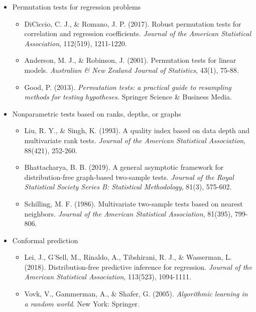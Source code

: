 \documentclass[11pt]{article}
\begin{document}
\begin{itemize}
\item Permutation tests for regression problems
\begin{itemize}
\item DiCiccio, C. J., \& Romano, J. P. (2017). Robust permutation tests for correlation and regression coefficients. \textit{Journal of the American Statistical Association}, 112(519), 1211-1220.

\item Anderson, M. J., \& Robinson, J. (2001). Permutation tests for linear models. \textit{Australian \& New Zealand Journal of Statistics}, 43(1), 75-88.

\item Good, P. (2013). \textit{Permutation tests: a practical guide to resampling methods for testing hypotheses.} Springer Science \& Business Media.
\end{itemize}

\item Nonparametric tests based on ranks, depths, or graphs
\begin{itemize}
\item Liu, R. Y., \& Singh, K. (1993). A quality index based on data depth and multivariate rank tests. \textit{Journal of the American Statistical Association}, 88(421), 252-260.

\item Bhattacharya, B. B. (2019). A general asymptotic framework for distribution-free graph-based two-sample tests. \textit{Journal of the Royal Statistical Society Series B: Statistical Methodology}, 81(3), 575-602.

\item Schilling, M. F. (1986). Multivariate two-sample tests based on nearest neighbors. \textit{Journal of the American Statistical Association}, 81(395), 799-806.
\end{itemize}

\item Conformal prediction
\begin{itemize}
\item Lei, J., G’Sell, M., Rinaldo, A., Tibshirani, R. J., \& Wasserman, L. (2018). Distribution-free predictive inference for regression. \textit{Journal of the American Statistical Association}, 113(523), 1094-1111.

\item Vovk, V., Gammerman, A., \& Shafer, G. (2005). \textit{Algorithmic learning in a random world}. New York: Springer.


\end{itemize}
\end{itemize}
\end{document}
